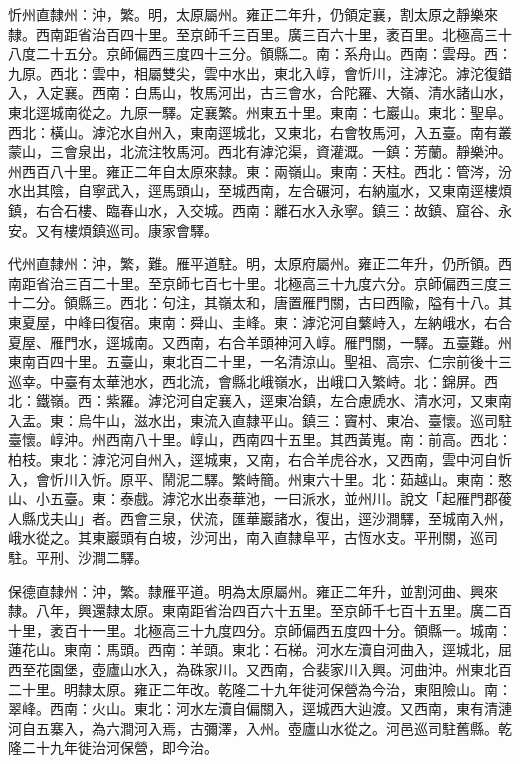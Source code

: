 \begin{pinyinscope}
忻州直隸州：沖，繁。明，太原屬州。雍正二年升，仍領定襄，割太原之靜樂來隸。西南距省治百四十里。至京師千三百里。廣三百六十里，袤百里。北極高三十八度二十五分。京師偏西三度四十三分。領縣二。南：系舟山。西南：雲母。西：九原。西北：雲中，相屬雙尖，雲中水出，東北入崞，會忻川，注滹沱。滹沱復錯入，入定襄。西南：白馬山，牧馬河出，古三會水，合陀羅、大嶺、清水諸山水，東北逕城南從之。九原一驛。定襄繁。州東五十里。東南：七巖山。東北：聖阜。西北：橫山。滹沱水自州入，東南逕城北，又東北，右會牧馬河，入五臺。南有叢蒙山，三會泉出，北流注牧馬河。西北有滹沱渠，資灌溉。一鎮：芳蘭。靜樂沖。州西百八十里。雍正二年自太原來隸。東：兩嶺山。東南：天柱。西北：管涔，汾水出其陰，自寧武入，逕馬頭山，至城西南，左合碾河，右納嵐水，又東南逕樓煩鎮，右合石樓、臨春山水，入交城。西南：離石水入永寧。鎮三：故鎮、窟谷、永安。又有樓煩鎮巡司。康家會驛。

代州直隸州：沖，繁，難。雁平道駐。明，太原府屬州。雍正二年升，仍所領。西南距省治三百二十里。至京師七百七十里。北極高三十九度六分。京師偏西三度三十二分。領縣三。西北：句注，其嶺太和，唐置雁門關，古曰西隃，隘有十八。其東夏屋，中峰曰復宿。東南：舜山、圭峰。東：滹沱河自蘩峙入，左納峨水，右合夏屋、雁門水，逕城南。又西南，右合羊頭神河入崞。雁門關，一驛。五臺難。州東南百四十里。五臺山，東北百二十里，一名清涼山。聖祖、高宗、仁宗前後十三巡幸。中臺有太華池水，西北流，會縣北峨嶺水，出峨口入繁峙。北：錦屏。西北：鐵嶺。西：紫羅。滹沱河自定襄入，逕東冶鎮，左合慮虒水、清水河，又東南入盂。東：烏牛山，滋水出，東流入直隸平山。鎮三：竇村、東冶、臺懷。巡司駐臺懷。崞沖。州西南八十里。崞山，西南四十五里。其西黃嵬。南：前高。西北：柏枝。東北：滹沱河自州入，逕城東，又南，右合羊虎谷水，又西南，雲中河自忻入，會忻川入忻。原平、鬧泥二驛。繁峙簡。州東六十里。北：茹越山。東南：憨山、小五臺。東：泰戲。滹沱水出泰華池，一曰派水，並州川。說文「起雁門郡葰人縣戊夫山」者。西會三泉，伏流，匯華巖諸水，復出，逕沙澗驛，至城南入州，峨水從之。其東巖頭有白坡，沙河出，南入直隸阜平，古恆水支。平刑關，巡司駐。平刑、沙澗二驛。

保德直隸州：沖，繁。隸雁平道。明為太原屬州。雍正二年升，並割河曲、興來隸。八年，興還隸太原。東南距省治四百六十五里。至京師千七百十五里。廣二百十里，袤百十一里。北極高三十九度四分。京師偏西五度四十分。領縣一。城南：蓮花山。東南：馬頭。西南：羊頭。東北：石梯。河水左瀆自河曲入，逕城北，屈西至花園堡，壺廬山水入，為硃家川。又西南，合裴家川入興。河曲沖。州東北百二十里。明隸太原。雍正二年改。乾隆二十九年徙河保營為今治，東阻險山。南：翠峰。西南：火山。東北：河水左瀆自偏關入，逕城西大辿渡。又西南，東有清漣河自五寨入，為六澗河入焉，古彌澤，入州。壺廬山水從之。河邑巡司駐舊縣。乾隆二十九年徙治河保營，即今治。


\end{pinyinscope}
